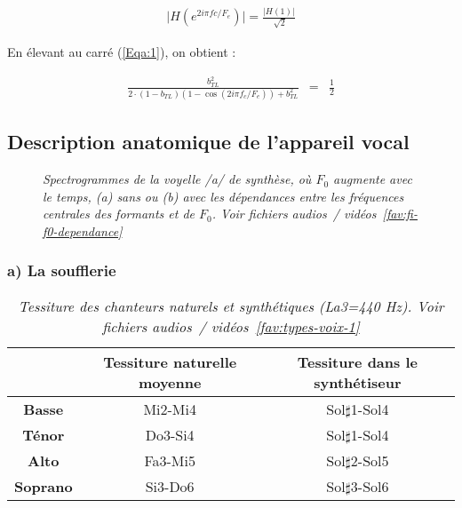 \begin{eqnarray} 
\vert H( e^{2i \pi fc /F_e}) \vert = \frac{\vert H(1) \vert}{ \sqrt[]{2}}  \label{Eqa:1}
\end{eqnarray}


\noindent En élevant au carré (\ref{Eqa:1}), on obtient :
 
\begin{eqnarray} 
	\frac{b_{TL}^2}{2 \cdot (1-b_{TL})(1-\cos(2i \pi f_c / F_e)) + b_{TL}^2} &=& \frac{1}{2}
\end{eqnarray}




\subsection{Description anatomique de l'appareil vocal}


\begin{figure}
  \centering
  \label{Fig:Fi-F0-dpdce_sans}
  \hspace{0.3cm}
  \label{Fig:Fi-F0-dpdce_avec}
    \caption{{\it Spectrogrammes de la voyelle /a/ de synthèse, où $F_0$ augmente avec le temps, (a) sans ou (b) avec les dépendances entre les fréquences centrales des formants et de $F_0$. \textit{Voir fichiers audios~/ vidéos~\ref{fav:fi-f0-dependance}}\\
}}
  \label{Fig:Fi-F0-dpdce}
\end{figure}

\subsubsection{a) La soufflerie}

\begin{table}[!h]
	\centering
	\begin{tabular}{|c|c|c|} 
		\hline
		& \centering \textbf{Tessiture naturelle moyenne} & \centering \textbf{Tessiture
dans le synthétiseur} \tabularnewline
		\hline
		\bf Basse & Mi2-Mi4 & Sol$\sharp$1-Sol4\\
		\hline
		\bf Ténor & Do3-Si4 & Sol$\sharp$1-Sol4\\
		\hline
		\bf Alto & Fa3-Mi5 & Sol$\sharp$2-Sol5\\
		\hline
		\bf Soprano & Si3-Do6 & Sol$\sharp$3-Sol6\\
		\hline
	\end{tabular}
	\caption{\textit{Tessiture des chanteurs naturels et synthétiques (La3=440 Hz). Voir fichiers audios~/ vidéos~\ref{fav:types-voix-1}}}
	\label{Tab:tessChant}
\end{table}

